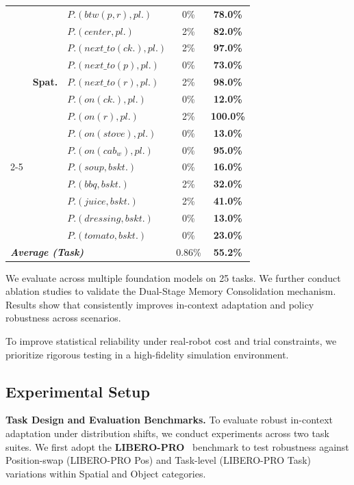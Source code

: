 \begin{table}[t]
{\begin{tabular}{l|clcc}
    \rule{0pt}{3ex} \multirow{14}{*}{\textbf{Task}} & \multirow{9}{*}{\textbf{Spat.}} 
      & $P.(btw(p, r), pl.)$          & 0\% & \textbf{78.0\%} \\
    & & $P.(center, pl.)$              & 2\% & \textbf{82.0\%} \\
    & & $P.(next\_to(ck.), pl.)$    & 2\% & \textbf{97.0\%} \\
    & & $P.(next\_to(p), pl.)$        & 0\% & \textbf{73.0\%} \\
    & & $P.(next\_to(r), pl.)$        & 2\% & \textbf{98.0\%} \\
    & & $P.(on(ck.), pl.)$          & 0\% & \textbf{12.0\%} \\
    & & $P.(on(r), pl.)$               & 2\% & \textbf{100.0\%} \\
    & & $P.(on(stove), pl.)$           & 0\% & \textbf{13.0\%} \\
    & & $P.(on(cab_{w}), pl.)$        & 0\% & \textbf{95.0\%} \\
    \cmidrule(l){2-5}
    & \rule{0pt}{2.5ex} \multirow{5}{*}{\textbf{Obj.}} 
      & $P.(soup, bskt.)$              & 0\% & \textbf{16.0\%} \\
    & & $P.(bbq, bskt.)$               & 2\% & \textbf{32.0\%} \\
    & & $P.(juice, bskt.)$             & 2\% & \textbf{41.0\%} \\
    & & $P.(dressing, bskt.)$          & 0\% & \textbf{13.0\%} \\
    & & $P.(tomato, bskt.)$            & 0\% & \textbf{23.0\%} \\
    \midrule
    \multicolumn{3}{l|}{\rule{0pt}{2.5ex} \textit{\textbf{Average (Task)}}} & 0.86\% & \textbf{55.2\%} \\
    \bottomrule
  \end{tabular}
  }
  \vspace{-1.5em}
\end{table}
We evaluate {\sys} across multiple foundation models on 25 tasks. We further conduct ablation studies to validate the Dual-Stage Memory Consolidation mechanism.
Results show that {\sys} consistently improves in-context adaptation and policy robustness across scenarios.

To improve statistical reliability under real-robot cost and trial constraints, we prioritize rigorous testing in a high-fidelity simulation environment.

\subsection{Experimental Setup}
\noindent\textbf{Task Design and Evaluation Benchmarks.}
To evaluate robust in-context adaptation under distribution shifts, we conduct experiments across two task suites. We first adopt the \textbf{LIBERO-PRO}~\cite{liberopro} benchmark to test robustness against Position-swap (LIBERO-PRO Pos) and Task-level (LIBERO-PRO Task) variations within Spatial and Object categories.

